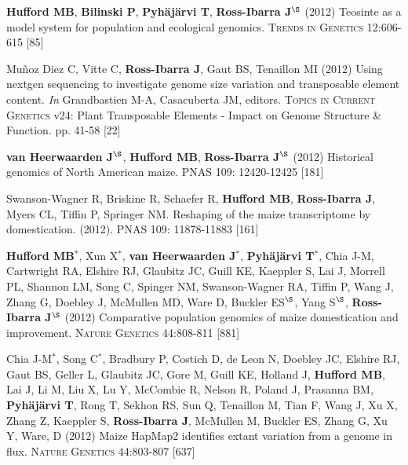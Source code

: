 \documentclass[letterpaper,10pt]{article}
\begin{document}
\begin{etaremune}
\item {\bf Hufford MB}, {\bf Bilinski P}, {\bf Pyh\"aj\"arvi T}, {\bf Ross-Ibarra J}$^\S$ (2012) Teosinte as a model system for population and ecological genomics. \textsc{Trends in Genetics} 12:606-615 %
 [85]\\


\item Mu\~{n}oz Diez C, Vitte C, {\bf Ross-Ibarra J}, Gaut BS, Tenaillon MI (2012) Using nextgen sequencing to investigate genome size variation and transposable element content. \emph{In} Grandbastien M-A, Casacuberta JM, editors. \textsc{Topics in Current Genetics} v24: Plant Transposable Elements - Impact on Genome Structure \& Function. pp. 41-58
 [22]\\


\item  {\bf van Heerwaarden J}$^\S$, {\bf Hufford MB}, {\bf Ross-Ibarra J}$^\S$ (2012) Historical genomics of North American maize. \textsc{PNAS} 109: 12420-12425
 [181]\\


\item Swanson-Wagner R, Briskine R, Schaefer R, {\bf Hufford MB}, {\bf Ross-Ibarra J}, Myers CL, Tiffin P, Springer NM.  Reshaping of the maize transcriptome by domestication. (2012). \textsc{PNAS}  109: 11878-11883
 [161]\\


\item {\bf Hufford MB}$^*$, Xun X$^*$, {\bf van Heerwaarden J}$^*$, {\bf Pyh\"aj\"arvi T}$^*$, Chia J-M, Cartwright RA, Elshire RJ, Glaubitz JC, Guill KE, Kaeppler S, Lai J, Morrell PL, Shannon LM, Song C, Spinger NM, Swanson-Wagner RA, Tiffin P, Wang J, Zhang G, Doebley J, McMullen MD, Ware D, Buckler ES$^\S$, Yang S$^\S$, {\bf Ross-Ibarra J}$^\S$ (2012) Comparative population genomics of maize domestication and improvement. \textsc{Nature Genetics} 44:808-811 %
 [881]\\


\item  Chia J-M$^*$, Song C$^*$, Bradbury P, Costich D, de Leon N, Doebley JC, Elshire RJ, Gaut BS, Geller L, Glaubitz JC, Gore M, Guill KE, Holland J,  {\bf Hufford MB}, Lai J, Li M, Liu X, Lu Y, McCombie R, Nelson R, Poland J, Prasanna BM,  {\bf Pyh\"aj\"arvi T}, Rong T, Sekhon RS,  Sun Q, Tenaillon M, Tian F, Wang J, Xu X, Zhang Z, Kaeppler S, {\bf Ross-Ibarra J}, McMullen M, Buckler ES, Zhang G, Xu Y, Ware, D (2012) Maize HapMap2 identifies extant variation from a genome in flux. \textsc{Nature Genetics} 44:803-807 %
 [637]\\



\end{etaremune}
\end{document}
